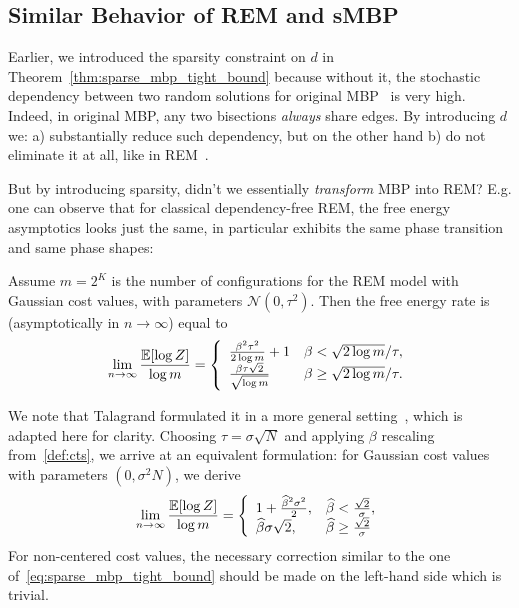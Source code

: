 \subsection{Similar Behavior of REM and sMBP}
\label{sec:smbp_rem_similar}
Earlier, we introduced the sparsity constraint on $d$ in
Theorem~\ref{thm:sparse_mbp_tight_bound} because without it, the stochastic
dependency between two random solutions for original MBP~\citep{garey79} is very
high. Indeed, in original MBP, any two bisections \textit{always} share edges.
By introducing $d$ we: a) substantially reduce such dependency, but on the other
hand b) do not eliminate it at all, like in REM~\citep{derrida81}. 

But by introducing sparsity, didn't we essentially \textit{transform} MBP into
REM? E.g. one can observe that for classical dependency-free REM, the free
energy asymptotics looks just the same, in particular exhibits the same phase
transition and same phase shapes:

\begin{theorem} \label{thm:rem}
  Assume $m = 2^K$ is the number of configurations for the REM model with
  Gaussian cost values, with parameters $\mathcal{N}(0, \tau^2)$. Then the
  free energy rate is (asymptotically in $n \to \infty$) equal to
    \begin{equation} \label{eq:talagrand_rem_with_tau}
      \lim_{n \to \infty} \frac{{\mathbb{E}}[\log Z]}{\log m}=
      \left\{ \begin{array}{ll}
      \frac{\beta^2 \tau^2}{2 \log m} + 1 & 
      \beta < \sqrt{2 \log m}/\tau,\\
      \frac{\beta \tau \sqrt{2}}{\sqrt{\log m}} & \beta \ge \sqrt{2 \log m}/\tau.
      \end{array}
      \right.
    \end{equation}
\end{theorem}
We note that Talagrand formulated it in a more general setting~\citep[cf.][Prop.
1.1.3]{talagrand03}, which is adapted here for clarity. Choosing $\tau = \sigma
\sqrt{N}$ and applying $\beta$ rescaling from~\ref{def:cts}, we arrive at an
equivalent formulation: for Gaussian cost values with parameters $(0, \sigma^2
N)$, we derive
\begin{equation} \label{eq:talagrand_rem_adapted}
  \lim_{n \to \infty} \frac{{\mathbb{E}}[\log Z]}{\log m}=
  \left\{ 
    \begin{array}{ll}
      1+\frac{\widehat \beta^2\sigma^2}{2}, &
        \widehat \beta< \frac{\sqrt{2}}{\sigma},\\
      \widehat \beta \sigma \sqrt{2}, & 
        \widehat \beta \ge \frac{\sqrt{2}}{\sigma}
    \end{array}
  \right.
\end{equation}
\myremark For non-centered cost values, the necessary
correction similar to the one of~\eqref{eq:sparse_mbp_tight_bound} should be
made on the left-hand side which is trivial.

